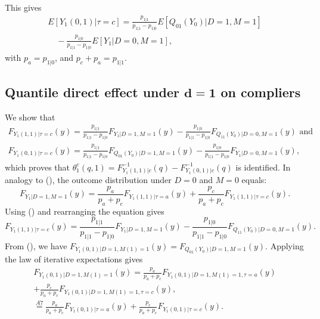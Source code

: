 \documentclass[a4paper,12pt]{article}
\begin{document}
 \doublespacing \pagestyle{plain}
This gives
\begin{equation} 
\begin{array}{rl}
E[Y_1(0,1)|\tau=c] =  \displaystyle \frac{p_{1|1}}{p_{1|1}-p_{1|0}}E[Q_{01}(Y_0)|D=1,M=1] \\
 \displaystyle \quad - \frac{p_{1|0}}{p_{1|1}-p_{1|0}}E[Y_1|D=0,M=1],
\end{array}
\end{equation}
with $p_a = p_{1|0}$, and $p_c +p_a =p_{1|1}$.
\subsection{Quantile direct effect
under $\mathbf{d = 1}$ on compliers}
We show that
\begin{align*}
 F_{Y_{1}(1,1)|\tau=c}(y) =  \frac{p_{1|1}}{p_{1|1} - p_{1|0}} F_{Y_{1}|D=1,M=1}(y) - \frac{p_{1|0} }{p_{1|1} - p_{1|0}}F_{Q_{11}(Y_0)|D=0,M=1}(y) \mbox{ and} \\
F_{Y_{1}(0,1)|\tau=c}(y) = \frac{p_{1|1}}{p_{1|1} - p_{1|0}}  F_{Q_{01}(Y_{0})|D=1,M=1}(y) - \frac{p_{1|0}}{ p_{1|1} - p_{1|0}}  F_{Y_1|D=0,M=1}(y)  ,
\end{align*}
which proves that $\theta_1^{c}(q,1) = F_{Y_{1}(1,1)|c}^{-1}(q)-F_{Y_{1}(0,1)|c}^{-1}(q)$ is identified.
In analogy to (), the outcome distribution under $D=0$ and $M=0$ equals:
\begin{equation*}
F_{Y_{1}|D=1,M=1}(y)=\frac{p_a}{p_a + p_c}F_{Y_{1}(1,1)|\tau=a}(y)  + \frac{p_c}{p_a + p_c}F_{Y_{1}(1,1)|\tau=c}(y).
\end{equation*}
Using () and rearranging the equation gives
\begin{equation}
F_{Y_{1}(1,1)|\tau=c}(y)= \frac{p_{1|1}}{p_{1|1} - p_{1|0}} F_{Y_{1}|D=1,M=1}(y) - \frac{p_{1|0} }{p_{1|1} - p_{1|0}}F_{Q_{11}(Y_0)|D=0,M=1}(y) . 
\end{equation}
From (), we have $F_{Y_{1}(0,1)|D=1,M(1)=1}(y)  =F_{Q_{01}(Y_{0})|D=1,M=1}(y)$. Applying the law of iterative expectations gives
\begin{align*}
F_{Y_{1}(0,1)|D=1,M(1)=1}(y)   =\frac{p_a}{p_a + p_c} F_{Y_{1}(0,1)|D=1,M(1)=1,\tau=a}(y)
\\  +\frac{p_c}{p_a + p_c} F_{Y_{1}(0,1)|D=1,M(1)=1,\tau=c}(y),\\
 \stackrel{A7}{=} \frac{p_a}{p_a + p_c} F_{Y_{1}(0,1)|\tau=a}(y) +\frac{p_c}{p_a + p_c} F_{Y_{1}(0,1)|\tau=c}(y).
\end{align*}
\end{document}
